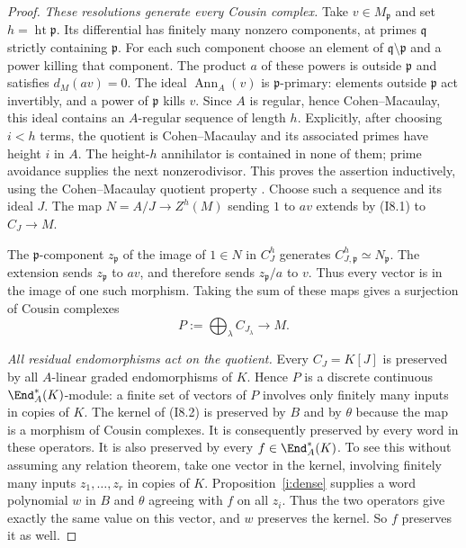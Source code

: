 \begin{proof}
\emph{These resolutions generate every Cousin complex.}
Take $v\in M_{\mathfrak p}$ and set
$h=\operatorname{ht}\mathfrak p$. Its differential has finitely
many nonzero components, at primes $\mathfrak q$ strictly containing
$\mathfrak p$. For each such component choose an element of
$\mathfrak q\setminus\mathfrak p$ and a power killing that
component. The product $a$ of these powers is outside
$\mathfrak p$ and satisfies $d_M(av)=0$.
The ideal $\operatorname{Ann}_A(v)$ is $\mathfrak p$-primary:
elements outside $\mathfrak p$ act invertibly, and a power of
$\mathfrak p$ kills $v$. Since $A$ is regular, hence
Cohen--Macaulay, this ideal contains an $A$-regular sequence of
length $h$. Explicitly, after choosing $i<h$ terms, the quotient
is Cohen--Macaulay and its associated primes have height $i$ in
$A$. The height-$h$ annihilator is contained in none of them; prime
avoidance supplies the next nonzerodivisor. This proves the assertion
inductively, using the Cohen--Macaulay quotient property
\cite[Lemma 10.104.2, tag 02JN]{StacksCMRegularSequence}.
Choose such a sequence and its ideal $J$.
The map $N=A/J\to Z^h(M)$ sending $1$ to $av$ extends by
(I8.1) to $C_J\to M$.

The $\mathfrak p$-component $z_{\mathfrak p}$ of the image of
$1\in N$ in $C_J^h$ generates
$C_{J,\mathfrak p}^h\simeq N_{\mathfrak p}$. The extension sends
$z_{\mathfrak p}$ to $av$, and therefore sends
$z_{\mathfrak p}/a$ to $v$. Thus every vector is in the image of
one such morphism. Taking the sum of these maps gives a surjection
of Cousin complexes
\[
                    P:=\bigoplus_\lambda C_{J_\lambda}
                    \longrightarrow M.                  \tag{I8.2}
\]

\emph{All residual endomorphisms act on the quotient.}
Every $C_J=K[J]$ is preserved by all $A$-linear graded
endomorphisms of $K$. Hence $P$ is a discrete continuous
$\End_A^*(K)$-module: a finite set of vectors of $P$ involves only
finitely many inputs in copies of $K$.
The kernel of (I8.2) is preserved by $B$ and by $\theta$ because
the map is a morphism of Cousin complexes. It is consequently
preserved by every word in these operators. It is also preserved by
every $f\in\End_A^*(K)$. To see this without assuming any
relation theorem, take one vector in the kernel, involving
finitely many inputs $z_1,\ldots,z_r$ in copies of $K$.
Proposition~\ref{i:dense} supplies a word polynomial $w$ in $B$
and $\theta$ agreeing with $f$ on all $z_i$. Thus the two operators
give exactly the same value on this vector, and $w$ preserves the
kernel. So $f$ preserves it as well.


\end{proof}
